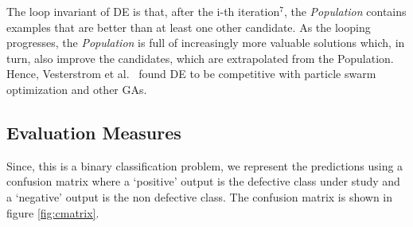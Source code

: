 \documentclass[sigconf,review, anonymous]{acmart}
\theoremstyle{break}
\begin{document}
The loop invariant of DE is that, after the i-th iteration$^7$, the \textit{Population}
contains examples that are better than at least one other candidate.
As the looping progresses, the \textit{Population} is full of increasingly more valuable solutions
which, in turn, also improve the candidates, which are extrapolated from the Population.
Hence, Vesterstrom et al.~\cite{vesterstrom2004comparative} found DE to be
competitive with particle swarm optimization and other GAs.


\subsection{\textbf{Evaluation Measures}}
\label{sect:measure}

Since, this is a binary classification problem, we represent the predictions using a confusion matrix where a `positive' output is the defective class under study and a `negative' output is the non defective class. The confusion matrix is shown in figure \ref{fig:cmatrix}.


\end{document}
